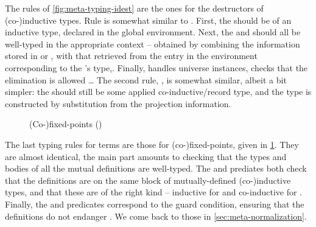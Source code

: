 \begin{figure*}
  \ContinuedFloat
  \caption{(Co-)inductive destructors ()}
  \label{fig:meta-typing-idest}
\end{figure*}

The rules of \cref{fig:meta-typing-idest} are the ones for the destructors of (co-)inductive
types. Rule  is somewhat similar to . First,
the  should be of an inductive type, declared in the global environment.
Next, the  and  should all be well-typed
in the appropriate context – obtained by combining the information stored in
 or , with that retrieved from the entry in the environment corresponding to
the 's type,.
Finally,  handles universe instances, checks
that the elimination is allowed%
…
The second rule, , is somewhat similar, albeit a bit simpler: the 
should still be some applied co-inductive/record type, and the type is constructed by
substitution from the projection information.

\begin{figure}
  \ContinuedFloat
  \caption{(Co-)fixed-points ()}
  \label{fig:meta-typing-fix}
\end{figure}

The last typing rules for terms are those for (co-)fixed-points,
given in \cref{fig:meta-typing-fix}. They are almost identical,
the main part amounts to checking that the types and bodies of all
the mutual definitions are well-typed.
The  and 
prediates both check that the definitions are on
the same block of mutually-defined (co-)inductive types, and that these are of the right kind –
inductive for  and co-inductive for .
Finally, the  and  predicates correspond to the guard condition,
ensuring that the definitions do not endanger . We come back to those in
\cref{sec:meta-normalization}.

